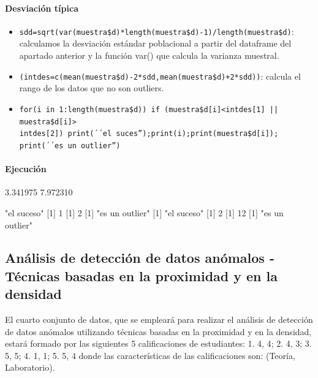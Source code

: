 \documentclass[a4paper, 12pt]{article}
\begin{document}
	\paragraph{Desviación típica}
	\begin{itemize}
		\item \texttt{sdd=sqrt(var(muestra\$d)*length(muestra\$d)-1)/length(muestra\$d)}: calculamos la desviación estándar poblacional a partir del dataframe del apartado anterior y la función var() que calcula la varianza muestral.
		\item \texttt{(intdes=c(mean(muestra\$d)-2*sdd,mean(muestra\$d)+2*sdd))}: calcula el rango de los datos que no son outliers.
		\item \texttt{for(i in 1:length(muestra\$d)) {if (muestra\$d[i]<intdes[1] || muestra\$d[i]>\\intdes[2]) {print(´´el suces'');print(i);print(muestra\$d[i]);\\print(´´es un outlier'')}}}
	\end{itemize}
	\paragraph{Ejecución}
\begin{Schunk}
\begin{Soutput}
[1] 3.341975 7.972310
\end{Soutput}
\begin{Soutput}
[1] "el suceso"
[1] 1
[1] 2
[1] "es un outlier"
[1] "el suceso"
[1] 2
[1] 12
[1] "es un outlier"
\end{Soutput}
\end{Schunk}
	\subsection{Análisis de detección de datos anómalos - Técnicas basadas en la proximidad y en la densidad}
	El cuarto conjunto de datos, que se empleará para realizar el análisis de detección de datos anómalos utilizando técnicas basadas en la proximidad y en la densidad, estará formado por las siguientes 5 calificaciones de estudiantes: 1. {4, 4}; 2. {4, 3}; 3. {5, 5}; 4. {1, 1}; 5. {5, 4} donde las características de las calificaciones son: (Teoría, Laboratorio).
	
\end{document}

